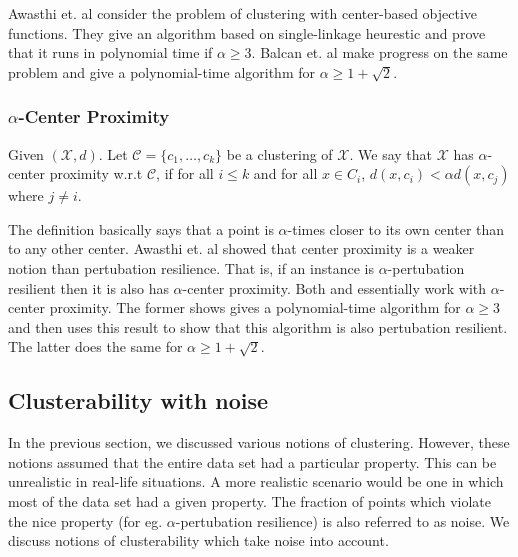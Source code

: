 \documentclass[11pt]{article}
\newcommand{\mc}{\mathcal}
\begin{document}
Awasthi et. al \cite{awasthi2012center} consider the problem of clustering with center-based objective functions. They give an algorithm based on single-linkage heurestic and prove that it runs in polynomial time if $\alpha \ge 3$. Balcan et. al \cite{balcan2012clustering} make progress on the same problem and give a polynomial-time algorithm for $\alpha \ge 1+\sqrt{2}$. 

\subsubsection*{$\alpha$-Center Proximity \cite{awasthi2012center}}
\begin{definition}
Given $(\mc X, d)$. Let $\mc C = \{c_1, \ldots, c_k\}$ be a clustering of $\mc X$. We say that $\mc X$ has $\alpha$-center proximity w.r.t $\mc C$, if for all $i \le k$ and for all $x \in C_i$, $d(x,c_i) < \alpha d(x, c_j)$ where $j \neq i$.   
\end{definition}
The definition basically says that a point is $\alpha$-times closer to its own center than to any other center.  Awasthi et. al \cite{awasthi2012center} showed that center proximity is a weaker notion than pertubation resilience. That is, if an instance is $\alpha$-pertubation resilient then it is also has $\alpha$-center proximity. Both \cite{awasthi2012center} and \cite{balcan2012clustering} essentially work with $\alpha$-center proximity. The former shows gives a polynomial-time algorithm for $\alpha \ge 3$ and then uses this result to show that this algorithm is also pertubation resilient. The latter does the same for $\alpha \ge 1 + \sqrt{2}$. 

\subsection{Clusterability with noise}
In the previous section, we discussed various notions of clustering. However, these notions assumed that the entire data set had a particular property. This can be unrealistic in real-life situations. A more realistic scenario would be one in which most of the data set had a given property. The fraction of points which violate the nice property (for eg. $\alpha$-pertubation resilience) is also referred to as noise. We discuss notions of clusterability which take noise into account. 
\end{document}
